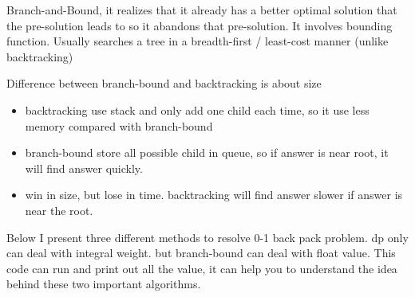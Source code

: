 \documentclass[a4paper,11pt,twoside]{book}
\begin{document}
	\par Branch-and-Bound, it realizes that it already has a better optimal solution that the pre-solution leads to so it abandons that pre-solution. It involves bounding function. Usually searches a tree in a breadth-first / least-cost manner (unlike backtracking)


%	
% 

\par Difference between branch-bound  and backtracking is about size

\begin{itemize}
\item backtracking use stack and only add one child each time, so it use less memory compared with branch-bound

\item branch-bound store all possible child in queue, so if answer is near root, it will find answer quickly. 

\item win in size, but lose in time. backtracking will find answer slower if answer is near the root.
\end{itemize}

	\par Below I present three different methods to resolve 0-1 back pack problem. dp only can deal with integral weight. but branch-bound can deal with float value. This code can run and print out all the value, it can help you to understand the idea behind these two important algorithms. 
\end{document}
